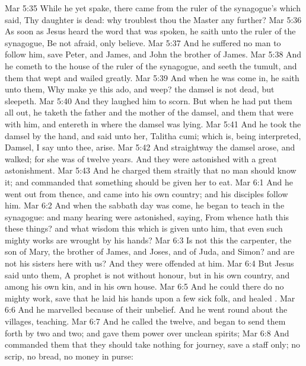 \vs Mar 5:35 While he yet spake, there came from the ruler of the synagogue's  which said, Thy daughter is dead: why troublest thou the Master any further?
\vs Mar 5:36 As soon as Jesus heard the word that was spoken, he saith unto the ruler of the synagogue, Be not afraid, only believe.
\vs Mar 5:37 And he suffered no man to follow him, save Peter, and James, and John the brother of James.
\vs Mar 5:38 And he cometh to the house of the ruler of the synagogue, and seeth the tumult, and them that wept and wailed greatly.
\vs Mar 5:39 And when he was come in, he saith unto them, Why make ye this ado, and weep? the damsel is not dead, but sleepeth.
\vs Mar 5:40 And they laughed him to scorn. But when he had put them all out, he taketh the father and the mother of the damsel, and them that were with him, and entereth in where the damsel was lying.
\vs Mar 5:41 And he took the damsel by the hand, and said unto her, Talitha cumi; which is, being interpreted, Damsel, I say unto thee, arise.
\vs Mar 5:42 And straightway the damsel arose, and walked; for she was  of twelve years. And they were astonished with a great astonishment.
\vs Mar 5:43 And he charged them straitly that no man should know it; and commanded that something should be given her to eat.
\vs Mar 6:1 And he went out from thence, and came into his own country; and his disciples follow him.
\vs Mar 6:2 And when the sabbath day was come, he began to teach in the synagogue: and many hearing  were astonished, saying, From whence hath this  these things? and what wisdom  this which is given unto him, that even such mighty works are wrought by his hands?
\vs Mar 6:3 Is not this the carpenter, the son of Mary, the brother of James, and Joses, and of Juda, and Simon? and are not his sisters here with us? And they were offended at him.
\vs Mar 6:4 But Jesus said unto them, A prophet is not without honour, but in his own country, and among his own kin, and in his own house.
\vs Mar 6:5 And he could there do no mighty work, save that he laid his hands upon a few sick folk, and healed .
\vs Mar 6:6 And he marvelled because of their unbelief. And he went round about the villages, teaching.
\vs Mar 6:7 And he called  the twelve, and began to send them forth by two and two; and gave them power over unclean spirits;
\vs Mar 6:8 And commanded them that they should take nothing for  journey, save a staff only; no scrip, no bread, no money in  purse:
